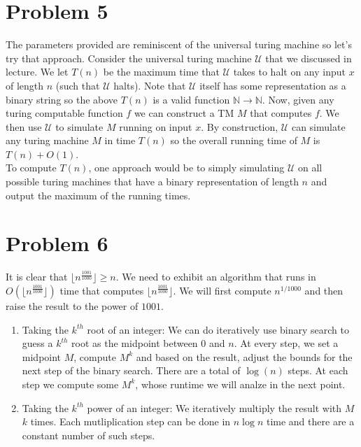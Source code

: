 \documentclass[usletter]{article}
\begin{document}
\section*{Problem 5}

The parameters provided are reminiscent of the universal turing machine so let's try that approach. Consider
the universal turing machine \(\mathcal{U}\) that we discussed in lecture. We let \(T(n)\) be the maximum time that
\(\mathcal{U}\) takes to halt on any input \(x\) of length \(n\) (such that \(\mathcal{U}\) halts). Note that \(\mathcal{U}\) itself has 
some representation as a binary string so the above \(T(n)\) is a valid function \(\mathbb{N} \to \mathbb{N}\). Now, given any turing computable function
\(f\) we can construct a TM \(M\) that computes \(f\). We then use \(\mathcal{U}\) to simulate \(M\) running on input \(x\). By construction, \(\mathcal{U}\) can 
simulate any turing machine \(M\) in time \(T(n)\) so the overall running time of \(M\) is \(T(n) + O(1)\). \\

To compute \(T(n)\), one approach would be to simply simulating \(\mathcal{U}\) on all possible turing machines that have a binary representation of length \(n\)
and output the maximum of the running times.

\newpage

\section*{Problem 6}

It is clear that \(\lfloor n^{\frac{1001}{1000}} \rfloor \geq n\). We need to exhibit an algorithm that runs in \(O(\lfloor n^{\frac{1001}{1000}} \rfloor)\) time that computes \(\lfloor n^{\frac{1001}{1000}} \rfloor\).
We will first compute \(n^{1/1000}\) and then raise the result to the power of \(1001\).
\begin{enumerate}
    \item Taking the \(k^{th}\) root of an integer: We can do iteratively use binary search to guess a \(k^{th}\) root as the midpoint between \(0\) and \(n\). At every step, 
    we set a midpoint \(M\), compute \(M^k\) and based on the result, adjust the bounds for the next step of the binary search. There are a total of \(\log (n)\) steps. At each step we compute
    some \(M^k\), whose runtime we will analze in the next point. 
    \item Taking the \(k^{th}\) power of an integer: We iteratively multiply the result with \(M\) \(k\) times. Each mutliplication step can be done in \(n \log n\) time and there are a constant number of such steps. 
\end{enumerate}
\end{document}
